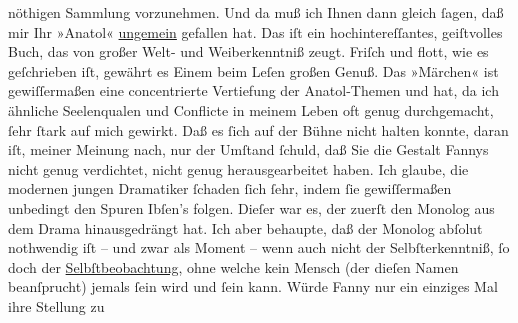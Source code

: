 \begin{ledgroupsized}[t]{13cm}
               nöthigen Sammlung vorzunehmen. Und da muß ich Ihnen dann gleich ſagen, daß mir Ihr
                  »Anatol« \uline{ungemein} gefallen hat. Das iſt ein hochintereſſantes, geiſtvolles Buch, das
               von großer Welt- und Weiberkenntniß zeugt. Friſch und flott, wie es geſchrieben iſt,
               gewährt es Einem beim Leſen großen Genuß. Das »Märchen« ist gewiſſermaßen eine concentrierte Vertiefung der Anatol-Themen und hat, da ich ähnliche Seelenqualen und
               Conflicte in meinem Leben oft genug durchgemacht, ſehr ſtark auf mich gewirkt. Daß es
               ſich auf der Bühne nicht halten konnte, daran iſt, meiner Meinung nach, nur der
               Umſtand ſchuld, daß Sie die Gestalt Fannys nicht genug verdichtet, nicht genug herausgearbeitet haben. Ich
               glaube, die modernen jungen Dramatiker {\pb}ſchaden ſich
               ſehr, indem ſie gewiſſermaßen unbedingt den Spuren Ibſen’s folgen. Dieſer war es, der zuerſt den Monolog aus dem Drama
               hinausgedrängt hat. Ich aber behaupte, daß der Monolog abſolut nothwendig iſt – und
               zwar als Moment – wenn auch nicht der Selbſterkenntniß, ſo doch der \uline{Selbſtbeobachtung}, ohne welche kein Mensch (der dieſen
               Namen beanſprucht) jemals ſein wird und ſein kann. Würde Fanny nur ein einziges Mal ihre Stellung zu

\end{ledgroupsized}
